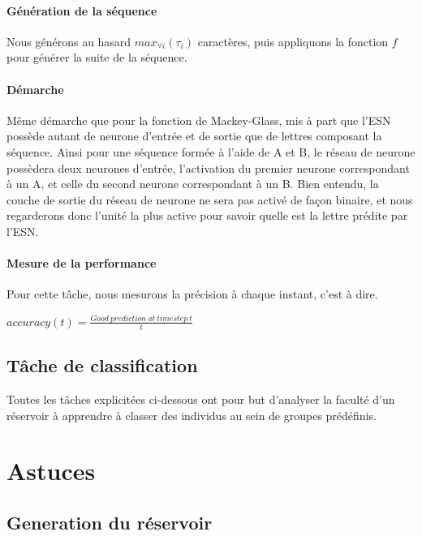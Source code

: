 \documentclass[12pt]{article}
\begin{document}
\paragraph{Génération de la séquence}
Nous générons au hasard $max_{\forall i}(\tau_{i})$ caractères, puis appliquons la fonction $f$ pour générer la suite de la séquence.
\paragraph{Démarche}
Même démarche que pour la fonction de Mackey-Glass, mis à part que l'ESN possède autant de neurone d'entrée et de sortie que de lettres composant la séquence. Ainsi pour une séquence formée à l'aide de A et B, le réseau de neurone possèdera deux neurones d'entrée, l'activation du premier neurone correspondant à un A, et celle du second neurone correspondant à un B. Bien entendu, la couche de sortie du réseau de neurone ne sera pas activé de façon binaire, et nous regarderons donc l'unité la plus active pour savoir quelle est la lettre prédite par l'ESN.
\paragraph{Mesure de la performance}
Pour cette tâche, nous mesurons la précision à chaque instant, c'est à dire.
\begin{center}
$accuracy(t) = \frac{Good\ prediction\ at\ timestep\ t}{t}$
\end{center}

\subsection{Tâche de classification}

Toutes les tâches explicitées ci-dessous ont pour but d'analyser la faculté d'un réservoir à apprendre à classer des individus au sein de groupes prédéfinis. 



\section{Astuces}

\subsection{Generation du réservoir}
\end{document}
